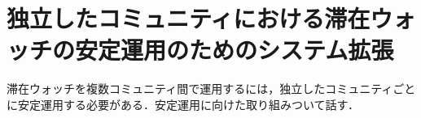 \section{独立したコミュニティにおける滞在ウォッチの安定運用のためのシステム拡張}
\label{sec:description}
滞在ウォッチを複数コミュニティ間で運用するには，独立したコミュニティごとに安定運用する必要がある．安定運用に向けた取り組みついて話す．



